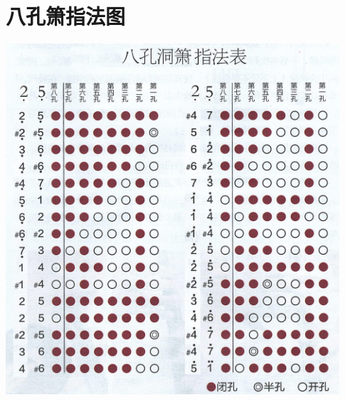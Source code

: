 \documentclass[cn,pad,chinese,chinesefont=nofont,math=newtx]{elegantbook}
\begin{document}
\chapter{八孔箫指法图}
\includegraphics[width=0.93\textwidth]{dongxiao/Scan.jpeg}
\end{document}
